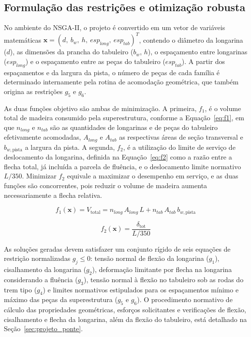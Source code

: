 \subsection{Formulação das restrições e otimização robusta}\label{sec:formulacao}

No ambiente do NSGA-II, o projeto é convertido em um vetor de variáveis matemáticas $\mathbf{x} = (d,\allowbreak\ b_w,\allowbreak\ h,\allowbreak\ esp_{long},\allowbreak\ esp_{tab})^T$, contendo o diâmetro da longarina ($d$), as dimensões da prancha do tabuleiro ($b_w$, $h$), o espaçamento entre longarinas ($esp_{long}$) e o espaçamento entre as peças do tabuleiro ($esp_{tab}$).
A partir dos espaçamentos e da largura da pista, o número de peças de cada família é determinado internamente pela rotina de acomodação geométrica, que também origina as restrições $g_5$ e $g_6$.

As duas funções objetivo são ambas de minimização.
A primeira, $f_1$, é o volume total de madeira consumido pela superestrutura, conforme a Equação~\eqref{eq:f1}, em que $n_{long}$ e $n_{tab}$ são as quantidades de longarinas e de peças do tabuleiro efetivamente acomodadas, $A_{long}$ e $A_{tab}$ as respectivas áreas de seção transversal e $b_{w,\mathrm{pista}}$ a largura da pista.
A segunda, $f_2$, é a utilização do limite de serviço de deslocamento da longarina, definida na Equação~\eqref{eq:f2} como a razão entre a flecha total, já incluída a parcela de fluência, e o deslocamento limite normativo $L/350$.
Minimizar $f_2$ equivale a maximizar o desempenho em serviço, e as duas funções são concorrentes, pois reduzir o volume de madeira aumenta necessariamente a flecha relativa.

\begin{equation}
f_1(\mathbf{x}) = V_{\mathrm{total}} = n_{long}\,A_{long}\,L + n_{tab}\,A_{tab}\,b_{w,\mathrm{pista}}
\label{eq:f1}
\end{equation}

\begin{equation}
f_2(\mathbf{x}) = \frac{\delta_{\mathrm{tot}}}{L/350}
\label{eq:f2}
\end{equation}

As soluções geradas devem satisfazer um conjunto rígido de seis equações de restrição normalizadas $g_j \leq 0$: tensão normal de flexão da longarina ($g_1$), cisalhamento da longarina ($g_2$), deformação limitante por flecha na longarina considerando a fluência ($g_3$), tensão normal à flexão no tabuleiro sob as rodas do trem tipo ($g_4$) e limites normativos estipulados para os espaçamentos mínimo e máximo das peças da superestrutura ($g_5$ e $g_6$).
O procedimento normativo de cálculo das propriedades geométricas, esforços solicitantes e verificações de flexão, cisalhamento e flecha da longarina, além da flexão do tabuleiro, está detalhado na Seção~\ref{sec:projeto_ponte}.

